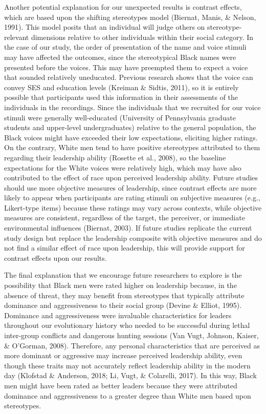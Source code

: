 \documentclass[
  english,
  man, noextraspace,floatsintext]{apa6}
\begin{document}
Another potential explanation for our unexpected results is contrast effects, which are based upon the shifting stereotypes model (Biernat, Manis, \& Nelson, 1991). This model posits that an individual will judge others on stereotype-relevant dimensions relative to other individuals within their social category. In the case of our study, the order of presentation of the name and voice stimuli may have affected the outcomes, since the stereotypical Black names were presented before the voices. This may have preempted them to expect a voice that sounded relatively uneducated. Previous research shows that the voice can convey SES and education levels (Kreiman \& Sidtis, 2011), so it is entirely possible that participants used this information in their assessments of the individuals in the recordings. Since the individuals that we recruited for our voice stimuli were generally well-educated (University of Pennsylvania graduate students and upper-level undergraduates) relative to the general population, the Black voices might have exceeded their low expectations, eliciting higher ratings. On the contrary, White men tend to have positive stereotypes attributed to them regarding their leadership ability (Rosette et al., 2008), so the baseline expectations for the White voices were relatively high, which may have also contributed to the effect of race upon perceived leadership ability. Future studies should use more objective measures of leadership, since contrast effects are more likely to appear when participants are rating stimuli on subjective measures (e.g., Likert-type items) because these ratings may vary across contexts, while objective measures are consistent, regardless of the target, the perceiver, or immediate environmental influences (Biernat, 2003). If future studies replicate the current study design but replace the leadership composite with objective measures and do not find a similar effect of race upon leadership, this will provide support for contrast effects upon our results.

The final explanation that we encourage future researchers to explore is the possibility that Black men were rated higher on leadership because, in the absence of threat, they may benefit from stereotypes that typically attribute dominance and aggressiveness to their social group (Devine \& Elliot, 1995). Dominance and aggressiveness were invaluable characteristics for leaders throughout our evolutionary history who needed to be successful during lethal inter-group conflicts and dangerous hunting sessions (Van Vugt, Johnson, Kaiser, \& O'Gorman, 2008). Therefore, any personal characteristics that are perceived as more dominant or aggressive may increase perceived leadership ability, even though these traits may not accurately reflect leadership ability in the modern day (Klofstad \& Anderson, 2018; Li, Vugt, \& Colarelli, 2017). In this way, Black men might have been rated as better leaders because they were attributed dominance and aggressiveness to a greater degree than White men based upon stereotypes.
\end{document}
